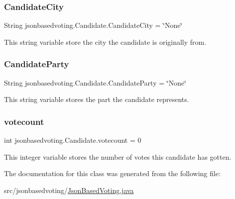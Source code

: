 \subsubsection{\texorpdfstring{CandidateCity}{CandidateCity}}
{\footnotesize\ttfamily String jsonbasedvoting.\+Candidate.\+Candidate\+City = \char`\"{}None\char`\"{}\hspace{0.3cm}{\ttfamily [package]}}

This string variable store the city the candidate is originally from. \mbox{\label{classjsonbasedvoting_1_1_candidate_a6c5b2323d17ea42029d902379e74c2a9}} 
\subsubsection{\texorpdfstring{CandidateParty}{CandidateParty}}
{\footnotesize\ttfamily String jsonbasedvoting.\+Candidate.\+Candidate\+Party = \char`\"{}None\char`\"{}\hspace{0.3cm}{\ttfamily [package]}}

This string variable stores the part the candidate represents. \mbox{\label{classjsonbasedvoting_1_1_candidate_acb80aff8c0ee8905e5477c4eef46baa3}} 
\subsubsection{\texorpdfstring{votecount}{votecount}}
{\footnotesize\ttfamily int jsonbasedvoting.\+Candidate.\+votecount = 0\hspace{0.3cm}{\ttfamily [package]}}

This integer variable stores the number of votes this candidate has gotten. 

The documentation for this class was generated from the following file\+:\begin{DoxyCompactItemize}
\item 
src/jsonbasedvoting/\mbox{\hyperlink{_json_based_voting_8java}{Json\+Based\+Voting.\+java}}\end{DoxyCompactItemize}
